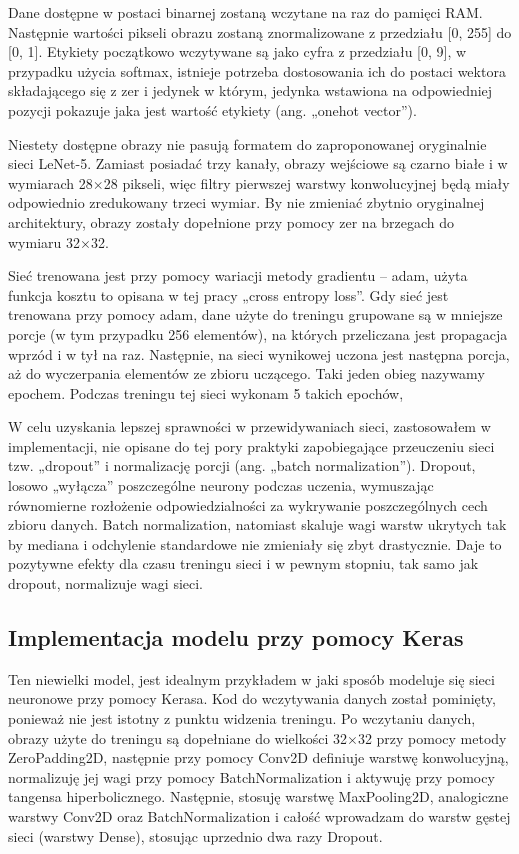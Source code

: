 Dane dostępne w postaci binarnej zostaną wczytane na raz do pamięci RAM.
Następnie wartości pikseli obrazu zostaną znormalizowane z przedziału
{[}0, 255{]} do {[}0, 1{]}. Etykiety początkowo wczytywane są jako cyfra
z przedziału {[}0, 9{]}, w przypadku użycia softmax, istnieje potrzeba
dostosowania ich do postaci wektora składającego się z zer i jedynek w
którym, jedynka wstawiona na odpowiedniej pozycji pokazuje jaka jest
wartość etykiety (ang. „onehot vector'').

Niestety dostępne obrazy nie pasują formatem do zaproponowanej
oryginalnie sieci LeNet-5. Zamiast posiadać trzy kanały, obrazy
wejściowe są czarno białe i w wymiarach 28\(\times\)28 pikseli, więc
filtry pierwszej warstwy konwolucyjnej będą miały odpowiednio
zredukowany trzeci wymiar. By nie zmieniać zbytnio oryginalnej
architektury, obrazy zostały dopełnione przy pomocy zer na brzegach do
wymiaru 32\(\times\)32.

Sieć trenowana jest przy pomocy wariacji metody gradientu -- adam, użyta
funkcja kosztu to opisana w tej pracy „cross entropy loss''. Gdy sieć
jest trenowana przy pomocy adam, dane użyte do treningu grupowane są w
mniejsze porcje (w tym przypadku 256 elementów), na których przeliczana
jest propagacja wprzód i w tył na raz. Następnie, na sieci wynikowej
uczona jest następna porcja, aż do wyczerpania elementów ze zbioru
uczącego. Taki jeden obieg nazywamy epochem. Podczas treningu tej sieci
wykonam 5 takich epochów,

W celu uzyskania lepszej sprawności w przewidywaniach sieci,
zastosowałem w implementacji, nie opisane do tej pory praktyki
zapobiegające przeuczeniu sieci tzw. „dropout'' i normalizację porcji
(ang. „batch normalization''). Dropout, losowo „wyłącza'' poszczególne
neurony podczas uczenia, wymuszając równomierne rozłożenie
odpowiedzialności za wykrywanie poszczególnych cech zbioru danych. Batch
normalization, natomiast skaluje wagi warstw ukrytych tak by mediana i
odchylenie standardowe nie zmieniały się zbyt drastycznie. Daje to
pozytywne efekty dla czasu treningu sieci i w pewnym stopniu, tak samo
jak dropout, normalizuje wagi
sieci.

\subsection{Implementacja modelu przy pomocy Keras}

Ten niewielki model, jest idealnym przykładem w jaki sposób modeluje się sieci neuronowe przy pomocy Kerasa. 
Kod do wczytywania danych został pominięty, ponieważ nie jest istotny z punktu widzenia treningu. 
Po wczytaniu danych, obrazy użyte do treningu są dopełniane do wielkości 32\(\times\)32 przy pomocy metody ZeroPadding2D, 
następnie przy pomocy Conv2D definiuje warstwę konwolucyjną, normalizuję jej wagi przy pomocy BatchNormalization i 
aktywuję przy pomocy tangensa hiperbolicznego. Następnie, stosuję warstwę MaxPooling2D, analogiczne warstwy 
Conv2D oraz BatchNormalization i całość wprowadzam do warstw gęstej sieci (warstwy Dense), stosując uprzednio dwa razy Dropout.

